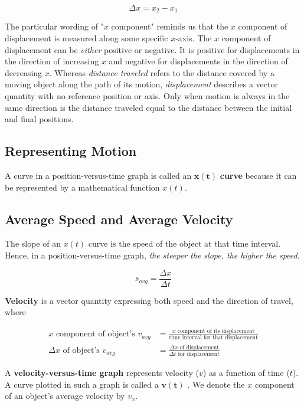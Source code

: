         \[
            \Delta x = x_2 - x_1
        \]

        \noindent The particular wording of "$x$ component" reminds us that the $x$ component of displacement is measured along some specific $x$-axis. The $x$ component of displacement can be \textit{either} positive or
        negative. It is positive for displacements in the direction of increasing $x$ and negative for displacements in the direction of decreasing $x$. Whereas \textit{distance traveled} refers to the distance covered
        by a moving object along the path of its motion, \textit{displacement} describes a vector quantity with no reference position or axis. Only when motion is always in the same direction is the distance traveled
        equal to the distance between the initial and final positions.




    \subsection{Representing Motion}
        A curve in a position-versus-time graph is called an $\bm{x(t)}$ \textbf{curve} because it can be represented by a mathematical function $x(t)$.



    \subsection{Average Speed and Average Velocity}
        The slope of an $x(t)$ curve is the speed of the object at that time interval. Hence, in a position-versus-time graph, \textit{the steeper the slope, the higher the speed}.

        \[
            s_{avg} = \frac{\Delta x}{\Delta t}
        \]

        \noindent \textbf{Velocity} is a vector quantity expressing both speed and the direction of travel, where

        \begin{align*}
            x\text{ component of object's } v_{avg} &= \frac{x \text{ component of its displacement}}{\text{time interval for that displacement}} \\
            \Delta x \text{ of object's } v_{avg}   &= \frac{\Delta x \text{ of displacement}}{\Delta t \text{ for displacement}}
        \end{align*}

        \noindent A \textbf{velocity-versus-time graph} represents velocity ($v$) as a function of time ($t$). A curve plotted in such a graph is called a $\bm{v(t)}$ . We denote the $x$ component of an
        object's average velocity by $v_x$.




